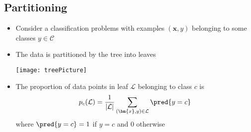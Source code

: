 
\begin{slide}
\section[-2]{Partitioning}

\begin{PauseHighLight}
  \begin{itemize}
  \item Consider a classification problems with examples $(\bm{x}, y)$
    belonging to some classes $y\in\mathcal{C}$\pause
  \item The data is partitioned by the tree into leaves
    \begin{center}
      \texttt{[image: treePicture]}\pause
    \end{center}
    \vspace*{-1.6em}

  \item The proportion of data points in leaf $\mathcal{L}$ belonging to
    class $c$ is
    \begin{align*}
      p_{c}(\mathcal{L}) = \frac{1}{|\mathcal{L}|}
      \sum_{(\bm{x},y)\in\mathcal{L}} \pred{y = c}
    \end{align*}
    where $\pred{y = c} = 1$ if $y=c$ and 0 otherwise\pause
  \end{itemize}
\end{PauseHighLight}

\end{slide}



